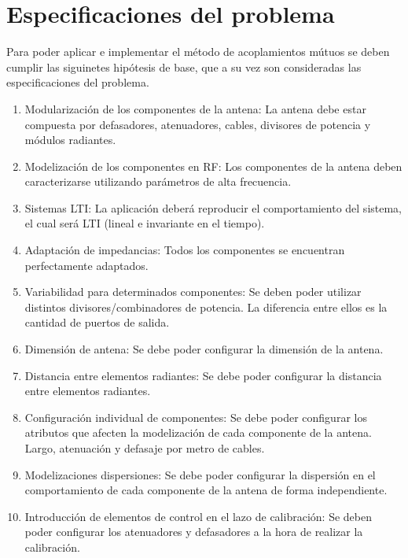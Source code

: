 \section{Especificaciones del problema}

Para poder aplicar e implementar el método de acoplamientos mútuos se deben cumplir las siguinetes hipótesis de base, que a su 
vez son consideradas las especificaciones del problema.

\begin{enumerate}
    \item Modularización de los componentes de la antena: La antena debe estar compuesta por defasadores, atenuadores, cables, 
		divisores de potencia y módulos radiantes.
    
	\item Modelización de los componentes en RF: Los componentes de la antena deben caracterizarse utilizando parámetros de alta 
		frecuencia.

    \item Sistemas LTI: La aplicación deberá reproducir el comportamiento del sistema, el cual será LTI (lineal e invariante 
		en el tiempo).
   
	\item Adaptación de impedancias: Todos los componentes se encuentran perfectamente adaptados.

    \item Variabilidad para determinados componentes: Se deben poder utilizar distintos divisores/combinadores de potencia. 
		La diferencia entre ellos es la cantidad de puertos de salida.
    
    \item Dimensión de antena: Se debe poder configurar la dimensión de la antena.
    \item Distancia entre elementos radiantes: Se debe poder configurar la distancia entre elementos radiantes.
    \item Configuración individual de componentes: Se debe poder configurar los atributos que afecten la modelización de cada 
		componente de la antena. Largo, atenuación y defasaje por metro de cables. 
    
    \item Modelizaciones dispersiones: Se debe poder configurar la dispersión en el comportamiento de cada componente de la 
		antena de forma independiente.

    \item Introducción de elementos de control en el lazo de calibración: Se deben poder configurar los atenuadores y 
		defasadores a la hora de realizar la calibración. 


\end{enumerate}
